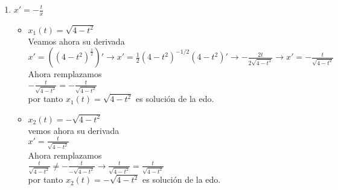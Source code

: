 \documentclass{article}
\begin{document}
\begin{enumerate}
        \item $x'=-\frac{t}{x}$
            \begin{itemize}
                \item $x_{1}(t)=\sqrt{4-t^{2}}$\\ Veamos ahora su derivada\\
                $x'=((4-t^{2})^{\frac{1}{2}})' \rightarrow x'= \frac{1}{2}(4-t^{2})^{-1/2}(4-t^{2})' \rightarrow -\frac{2t}{2\sqrt{4-t^{2}}}
                \rightarrow x'= -\frac{t}{\sqrt{4-t^{2}}} $ \\
                Ahora remplazamos\\
                $-\frac{t}{\sqrt{4-t^{2}}} = -\frac{t}{\sqrt{4-t^{2}}} $\\
                por tanto $x_{1}(t)=\sqrt{4-t^{2}}$ es solución de la edo.
                
                \item $x_{2}(t)=-\sqrt{4-t^{2}}$ \\ vemos ahora su derivada \\
                $x'=\frac{t}{\sqrt{4-t^{2}}}$\\Ahora remplazamos\\
                $\frac{t}{\sqrt{4-t^{2}}} \not = -\frac{t}{-\sqrt{4-t^{2}}} \rightarrow \frac{t}{\sqrt{4-t^{2}}} = \frac{t}{\sqrt{4-t^{2}}}$
                \\ por tanto $x_{2}(t)=-\sqrt{4-t^{2}}$ es solución de la edo.
            \end{itemize}
        



        

    \end{enumerate}
\end{document}

